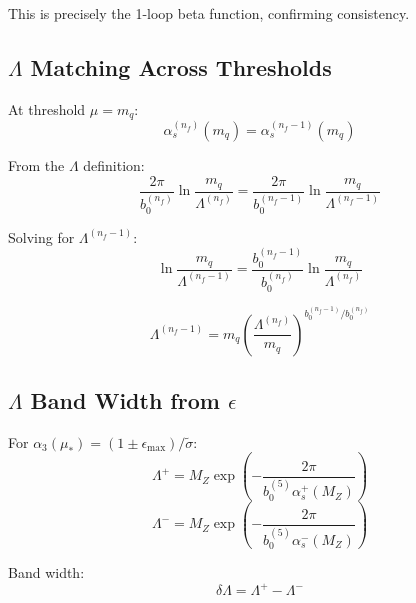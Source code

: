 \documentclass[11pt,a4paper]{article}
\theoremstyle{definition}
\begin{document}
This is precisely the 1-loop beta function, confirming consistency.

\subsection{$\Lambda$ Matching Across Thresholds}
\label{subsec:lambda-matching-app}

At threshold $\mu = m_q$:
\begin{equation}
\label{eq:lambda-match-app-1}
\alpha_s^{(n_f)}(m_q) = \alpha_s^{(n_f-1)}(m_q)
\end{equation}

From the $\Lambda$ definition:
\begin{equation}
\label{eq:lambda-match-app-2}
\frac{2\pi}{b_0^{(n_f)}}\ln\frac{m_q}{\Lambda^{(n_f)}} = \frac{2\pi}{b_0^{(n_f-1)}}\ln\frac{m_q}{\Lambda^{(n_f-1)}}
\end{equation}

Solving for $\Lambda^{(n_f-1)}$:
\begin{equation}
\label{eq:lambda-match-app-3}
\ln\frac{m_q}{\Lambda^{(n_f-1)}} = \frac{b_0^{(n_f-1)}}{b_0^{(n_f)}}\ln\frac{m_q}{\Lambda^{(n_f)}}
\end{equation}

\begin{equation}
\label{eq:lambda-match-app-4}
\Lambda^{(n_f-1)} = m_q \left(\frac{\Lambda^{(n_f)}}{m_q}\right)^{b_0^{(n_f-1)}/b_0^{(n_f)}}
\end{equation}

\subsection{$\Lambda$ Band Width from $\epsilon$}
\label{subsec:lambda-band-width}

For $\alpha_3(\mu_*) = (1 \pm \epsilon_{\max})/\tilde{\sigma}$:
\begin{equation}
\label{eq:lambda-upper}
\Lambda^+ = M_Z \exp\left(-\frac{2\pi}{b_0^{(5)} \alpha_s^+(M_Z)}\right)
\end{equation}
\begin{equation}
\label{eq:lambda-lower}
\Lambda^- = M_Z \exp\left(-\frac{2\pi}{b_0^{(5)} \alpha_s^-(M_Z)}\right)
\end{equation}

Band width:
\begin{equation}
\label{eq:lambda-band-calc}
\delta\Lambda = \Lambda^+ - \Lambda^-
\end{equation}
\end{document}
